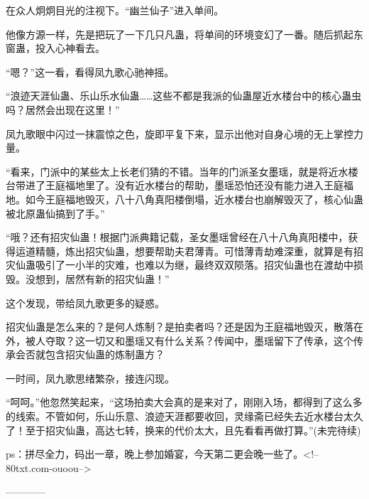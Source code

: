 \begin{this_body}
在众人炯炯目光的注视下。“幽兰仙子”进入单间。

他像方源一样，先是把玩了一下几只凡蛊，将单间的环境变幻了一番。随后抓起东窗蛊，投入心神看去。

“嗯？”这一看，看得凤九歌心驰神摇。

“浪迹天涯仙蛊、乐山乐水仙蛊……这些不都是我派的仙蛊屋近水楼台中的核心蛊虫吗？居然会出现在这里！”

凤九歌眼中闪过一抹震惊之色，旋即平复下来，显示出他对自身心境的无上掌控力量。

“看来，门派中的某些太上长老们猜的不错。当年的门派圣女墨瑶，就是将近水楼台带进了王庭福地里了。没有近水楼台的帮助，墨瑶恐怕还没有能力进入王庭福地。如今王庭福地毁灭，八十八角真阳楼倒塌，近水楼台也崩解毁灭了，核心仙蛊被北原蛊仙搞到了手。”

“哦？还有招灾仙蛊！根据门派典籍记载，圣女墨瑶曾经在八十八角真阳楼中，获得运道精髓，炼出招灾仙蛊，想要帮助夫君薄青。可惜薄青劫难深重，就算是有招灾仙蛊吸引了一小半的灾难，也难以为继，最终双双陨落。招灾仙蛊也在渡劫中损毁。没想到，居然有新的招灾仙蛊！”

这个发现，带给凤九歌更多的疑惑。

招灾仙蛊是怎么来的？是何人炼制？是拍卖者吗？还是因为王庭福地毁灭，散落在外，被人夺取？这一切又和墨瑶又有什么关系？传闻中，墨瑶留下了传承，这个传承会否就包含招灾仙蛊的炼制蛊方？

一时间，凤九歌思绪繁杂，接连闪现。

“呵呵。”他忽然笑起来，“这场拍卖大会真的是来对了，刚刚入场，都得到了这么多的线索。不管如何，乐山乐意、浪迹天涯都要收回，灵缘斋已经失去近水楼台太久了！至于招灾仙蛊，高达七转，换来的代价太大，且先看看再做打算。”(未完待续)

ps：拼尽全力，码出一章，晚上参加婚宴，今天第二更会晚一些了。<!--80txt.com-ouoou-->

------------

\end{this_body}

